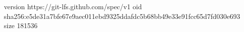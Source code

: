 version https://git-lfs.github.com/spec/v1
oid sha256:e5de31a7bfe67e9aec011ebd9325ddafdc5b68bb49e33e91fcc65d7fd030e693
size 181536
